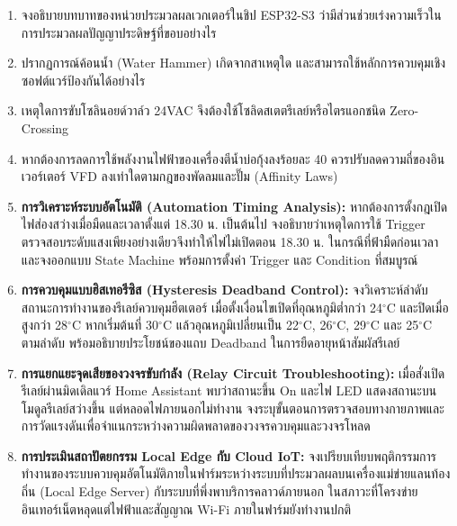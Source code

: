 \begin{enumerate}
    \item จงอธิบายบทบาทของหน่วยประมวลผลเวกเตอร์ในชิป ESP32-S3 ว่ามีส่วนช่วยเร่งความเร็วในการประมวลผลปัญญาประดิษฐ์ที่ขอบอย่างไร
    \item ปรากฏการณ์ค้อนน้ำ (Water Hammer) เกิดจากสาเหตุใด และสามารถใช้หลักการควบคุมเชิงซอฟต์แวร์ป้องกันได้อย่างไร
    \item เหตุใดการขับโซลินอยด์วาล์ว 24VAC จึงต้องใช้โซลิดสเตตรีเลย์หรือไตรแอกชนิด Zero-Crossing
    \item หากต้องการลดการใช้พลังงานไฟฟ้าของเครื่องตีน้ำบ่อกุ้งลงร้อยละ 40 ควรปรับลดความถี่ของอินเวอร์เตอร์ VFD ลงเท่าใดตามกฎของพัดลมและปั๊ม (Affinity Laws)
    \item \textbf{การวิเคราะห์ระบบอัตโนมัติ (Automation Timing Analysis):} หากต้องการตั้งกฎเปิดไฟส่องสว่างเมื่อมืดและเวลาตั้งแต่ 18.30 น. เป็นต้นไป จงอธิบายว่าเหตุใดการใช้ Trigger ตรวจสอบระดับแสงเพียงอย่างเดียวจึงทำให้ไฟไม่เปิดตอน 18.30 น. ในกรณีที่ฟ้ามืดก่อนเวลา และจงออกแบบ State Machine พร้อมการตั้งค่า Trigger และ Condition ที่สมบูรณ์
    \item \textbf{การควบคุมแบบฮิสเทอรีซิส (Hysteresis Deadband Control):} จงวิเคราะห์ลำดับสถานะการทำงานของรีเลย์ควบคุมฮีตเตอร์ เมื่อตั้งเงื่อนไขเปิดที่อุณหภูมิต่ำกว่า 24$^\circ$C และปิดเมื่อสูงกว่า 28$^\circ$C หากเริ่มต้นที่ 30$^\circ$C แล้วอุณหภูมิเปลี่ยนเป็น 22$^\circ$C, 26$^\circ$C, 29$^\circ$C และ 25$^\circ$C ตามลำดับ พร้อมอธิบายประโยชน์ของแถบ Deadband ในการยืดอายุหน้าสัมผัสรีเลย์
    \item \textbf{การแยกแยะจุดเสียของวงจรขับกำลัง (Relay Circuit Troubleshooting):} เมื่อสั่งเปิดรีเลย์ผ่านมิดเดิลแวร์ Home Assistant พบว่าสถานะขึ้น On และไฟ LED แสดงสถานะบนโมดูลรีเลย์สว่างขึ้น แต่หลอดไฟภายนอกไม่ทำงาน จงระบุขั้นตอนการตรวจสอบทางกายภาพและการวัดแรงดันเพื่อจำแนกระหว่างความผิดพลาดของวงจรควบคุมและวงจรโหลด
    \item \textbf{การประเมินสถาปัตยกรรม Local Edge กับ Cloud IoT:} จงเปรียบเทียบพฤติกรรมการทำงานของระบบควบคุมอัตโนมัติภายในฟาร์มระหว่างระบบที่ประมวลผลบนเครื่องแม่ข่ายแลนท้องถิ่น (Local Edge Server) กับระบบที่พึ่งพาบริการคลาวด์ภายนอก ในสภาวะที่โครงข่ายอินเทอร์เน็ตหลุดแต่ไฟฟ้าและสัญญาณ Wi-Fi ภายในฟาร์มยังทำงานปกติ
\end{enumerate}
\clearpage
